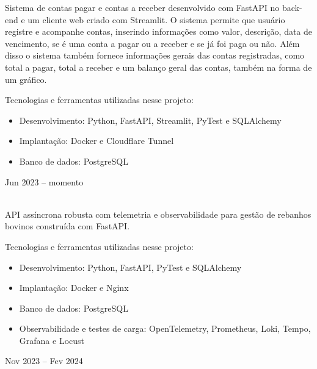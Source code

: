 \documentclass{cv}
\begin{document}
Sistema de contas pagar e contas a receber desenvolvido com FastAPI
no back-end e um cliente web criado com Streamlit. O sistema permite
que usuário registre e acompanhe contas, inserindo informações como
valor, descrição, data de vencimento, se é uma conta a pagar ou a
receber e se já foi paga ou não. Além disso o sistema também fornece
informações gerais das contas registradas, como total a pagar, total
a receber e um balanço geral das contas, também na forma de um gráfico.

\vspace{0.08cm}

Tecnologias e ferramentas utilizadas nesse projeto:

\begin{itemize}
  \item Desenvolvimento: Python, FastAPI, Streamlit, PyTest e SQLAlchemy
  \item Implantação: Docker e Cloudflare Tunnel
  \item Banco de dados: PostgreSQL
\end{itemize}

\hfill{Jun 2023 -- momento}\\
\\
\vspace{0.15cm}

API assíncrona robusta com telemetria e observabilidade para gestão
de rebanhos bovinos construída com FastAPI.

\vspace{0.08cm}

Tecnologias e ferramentas utilizadas nesse projeto:

\begin{itemize}
  \item Desenvolvimento: Python, FastAPI, PyTest e SQLAlchemy
  \item Implantação: Docker e Nginx
  \item Banco de dados: PostgreSQL
  \item Observabilidade e testes de carga: OpenTelemetry, Prometheus,
    Loki, Tempo, Grafana e Locust
\end{itemize}

\hfill{Nov 2023 -- Fev 2024}\\
\\
\vspace{0.15cm}
\end{document}
